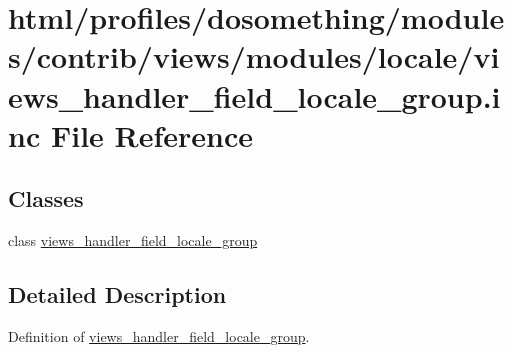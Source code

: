\hypertarget{views__handler__field__locale__group_8inc}{
\section{html/profiles/dosomething/modules/contrib/views/modules/locale/views\_\-handler\_\-field\_\-locale\_\-group.inc File Reference}
\label{views__handler__field__locale__group_8inc}
}
\subsection*{Classes}
\begin{DoxyCompactItemize}
\item 
class \hyperlink{classviews__handler__field__locale__group}{views\_\-handler\_\-field\_\-locale\_\-group}
\end{DoxyCompactItemize}


\subsection{Detailed Description}
Definition of \hyperlink{classviews__handler__field__locale__group}{views\_\-handler\_\-field\_\-locale\_\-group}. 